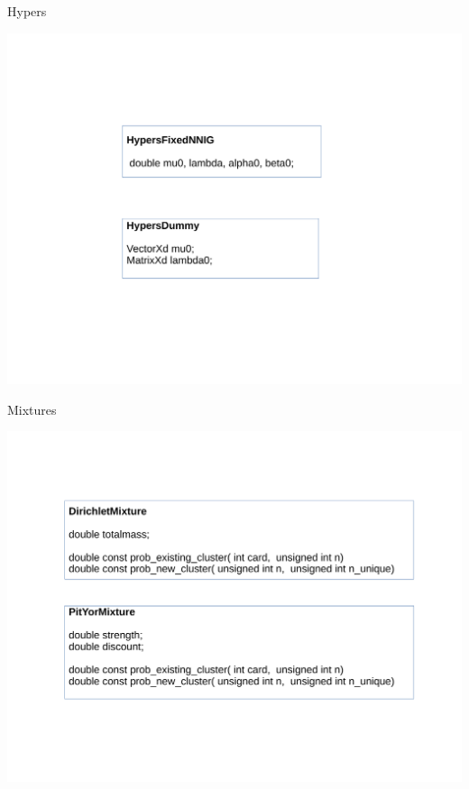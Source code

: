 \begin{frame}{Hypers}
	\begin{center}
		\includegraphics[scale=0.35]{etc/hypers.pdf}
	\end{center}
\end{frame}

\begin{frame}{Mixtures}
	\begin{center}
		\includegraphics[scale=0.35]{etc/mixture.pdf}
	\end{center}

\end{frame}